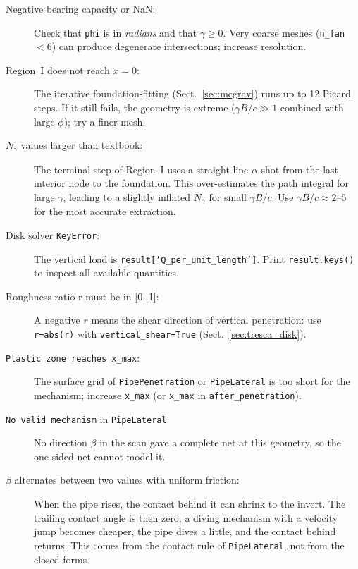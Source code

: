 \documentclass[11pt,a4paper]{article}
\begin{document}
\begin{description}
  \item[Negative bearing capacity or NaN:]
        Check that \texttt{phi} is in \emph{radians} and that
        $\gamma \geq 0$.  Very coarse meshes (\texttt{n\_fan} $< 6$)
        can produce degenerate intersections; increase resolution.

  \item[Region~I does not reach $x=0$:]
        The iterative foundation-fitting (Sect.~\ref{sec:mcgrav}) runs
        up to 12 Picard steps.  If it still fails, the geometry is
        extreme ($\gamma B/c \gg 1$ combined with large $\phi$); try a
        finer mesh.

  \item[$N_\gamma$ values larger than textbook:]
        The terminal step of Region~I uses a straight-line $\alpha$-shot
        from the last interior node to the foundation.  This
        over-estimates the path integral for large $\gamma$, leading to
        a slightly inflated $N_\gamma$ for small $\gamma B/c$.  Use
        $\gamma B/c \approx 2$–$5$ for the most accurate extraction.

  \item[Disk solver \texttt{KeyError}:]
        The vertical load is \texttt{result['Q\_per\_unit\_length']}.
        Print \texttt{result.keys()} to inspect all available
        quantities.

  \item[Roughness ratio r must be in {[0, 1]}:]
        A negative $r$ means the shear direction of vertical
        penetration: use \texttt{r=abs(r)} with
        \texttt{vertical\_shear=True} (Sect.~\ref{sec:tresca_disk}).

  \item[\texttt{Plastic zone reaches x\_max}:]
        The surface grid of \texttt{PipePenetration} or
        \texttt{PipeLateral} is too short for the mechanism; increase
        \texttt{x\_max} (or \texttt{x\_max} in
        \texttt{after\_penetration}).

  \item[\texttt{No valid mechanism} in \texttt{PipeLateral}:]
        No direction $\beta$ in the scan gave a complete net at this
        geometry, so the one-sided net cannot model it.

  \item[$\beta$ alternates between two values with uniform friction:]
        When the pipe rises, the contact behind it can shrink to the
        invert.  The trailing contact angle is then zero, a diving
        mechanism with a velocity jump becomes cheaper, the pipe dives
        a little, and the contact behind returns.  This comes from the
        contact rule of \texttt{PipeLateral}, not from the closed forms.


\end{description}
\end{document}
